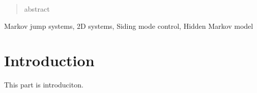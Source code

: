 \documentclass[conference]{IEEEtran}
\begin{document}




\maketitle

\begin{abstract}
	abstract
\end{abstract}


\begin{IEEEkeywords}
	Markov jump systems, 2D systems, Siding mode control, Hidden Markov model
\end{IEEEkeywords}



%
\IEEEpeerreviewmaketitle
  
   

\section{Introduction}
	This part is introduciton.
\end{document}
